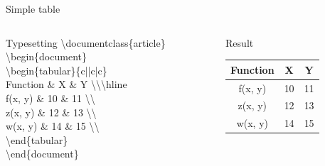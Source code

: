 \documentclass[10pt,xcolor={dvipsnames}]{beamer}
\begin{document}
		\begin{frame}{Simple table}
			\begin{columns}[T]
				
				\begin{column}{.6 \textwidth}
					\onslide<2->
					\begin{block}{Typesetting}
						\textbackslash documentclass\{{\color{blue}article}\}\\
						
						\textbackslash begin\{{\color{blue}document}\}\\
						
							\quad\textbackslash begin\{{\color{orange}tabular}\}{\color{orange}\{c||c|c\}}\\
								\qquad Function {\color{orange}\&} X {\color{orange}\&} Y {\color{orange}\textbackslash \textbackslash \textbackslash hline} \\
								\qquad f(x, y) {\color{orange}\&} 10 {\color{orange}\&} 11 {\color{orange}\textbackslash \textbackslash}\\
								\qquad z(x, y) {\color{orange}\&} 12 {\color{orange}\&} 13 {\color{orange}\textbackslash \textbackslash}\\
								\qquad w(x, y) {\color{orange}\&} 14 {\color{orange}\&} 15 {\color{orange}\textbackslash \textbackslash}\\
							\quad\textbackslash end\{{\color{orange}tabular}\}\\
						
						\quad\textbackslash end\{{\color{blue}document}\}
					\end{block}
				\end{column}
				
				\begin{column}{.4 \textwidth}
					\onslide<3->
					\begin{block}{Result}
						\begin{tabular}{c||c|c}
							Function & X & Y \\ \hline
							f(x, y) & 10 & 11\\
							z(x, y) & 12 & 13\\
							w(x, y) & 14 & 15 \\
						\end{tabular}	
					\end{block}
				\end{column}
				
			\end{columns}
			
		\end{frame}
	
\end{document}
